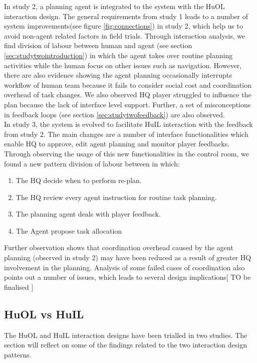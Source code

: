 In study 2, a planning agent is integrated to the system with the HuOL interaction design. The general requirements from study 1 leads to a number of system improvements(see figure \ref{fig:connections}) in study 2, which help us to avoid non-agent related factors in field trials. Through interaction analysis, we find division of labour between human and agent (see section \ref{sec:studytwointroduction}) in which the agent takes over routine planning activities while the human focus on other issues such as navigation. However, there are also evidence showing the agent planning occasionally interrupts workflow of human team because it fails to consider social cost and coordination overhead of task changes. We also observed HQ player struggled to influence the plan because the lack of interface level support. Further, a set of misconceptions in feedback loops (see section \ref{sec:studytwofeedback}) are also observed.\\

In study 3, the system is evolved to facilitate HuIL interaction with the feedback from study 2. The main changes are a number of interface functionalities which enable HQ to approve, edit agent planning and monitor player feedbacks. Through observing the usage of this new functionalities in the control room, we found a new pattern division of labour between in which:
	\begin{enumerate}
	 \item The HQ decide when to perform re-plan.
	 \item The HQ review every agent instruction for routine task planning.
	 \item The planning agent deals with player feedback.
	 \item The Agent propose task allocation
	\end{enumerate}
	
Further observation shows that coordination overhead caused by the agent planning (observed in study 2) may have been reduced as a result of greater HQ involvement in the planning. Analysis of some failed cases of coordination also points out a number of issues, which leads to several design implications[ TO be finalised ]  \\


\subsection{HuOL vs HuIL}
The HuOL and HuIL interaction designs have been trialled in two studies. The section will reflect on some of the findings related to the two interaction design patterns. \\

